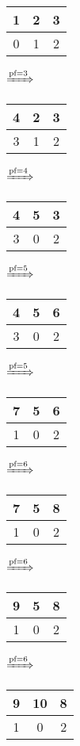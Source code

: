 \documentclass{article}
\begin{document}
\begin{itemize}
\begin{tabular}{|c|c|c|}
            \hline
            1 & 2 & 3\\
            \hline
            0 & 1 & 2\\
            \hline
        \end{tabular}
        $\xRightarrow{\text{pf}=3}$
        \begin{tabular}{|c|c|c|}
            \hline
            4 & 2 & 3\\
            \hline
            3 & 1 & 2\\
            \hline
        \end{tabular}
        $\xRightarrow{\text{pf}=4}$
        \begin{tabular}{|c|c|c|}
            \hline
            4 & 5 & 3\\
            \hline
            3 & 0 & 2\\
            \hline
        \end{tabular}
        $\xRightarrow{\text{pf}=5}$
        \begin{tabular}{|c|c|c|}
            \hline
            4 & 5 & 6\\
            \hline
            3 & 0 & 2\\
            \hline
        \end{tabular}
        $\xRightarrow{\text{pf}=5}$
        \begin{tabular}{|c|c|c|}
            \hline
            7 & 5 & 6\\
            \hline
            1 & 0 & 2\\
            \hline
        \end{tabular}
        $\xRightarrow{\text{pf}=6}$
        \begin{tabular}{|c|c|c|}
            \hline
            7 & 5 & 8\\
            \hline
            1 & 0 & 2\\
            \hline
        \end{tabular}
        $\xRightarrow{\text{pf}=6}$
        \begin{tabular}{|c|c|c|}
            \hline
            9 & 5 & 8\\
            \hline
            1 & 0 & 2\\
            \hline
        \end{tabular}
        $\xRightarrow{\text{pf}=6}$
        \begin{tabular}{|c|c|c|}
            \hline
            9 & 10 & 8\\
            \hline
            1 & 0 & 2\\

\end{tabular}
\end{itemize}
\end{document}
